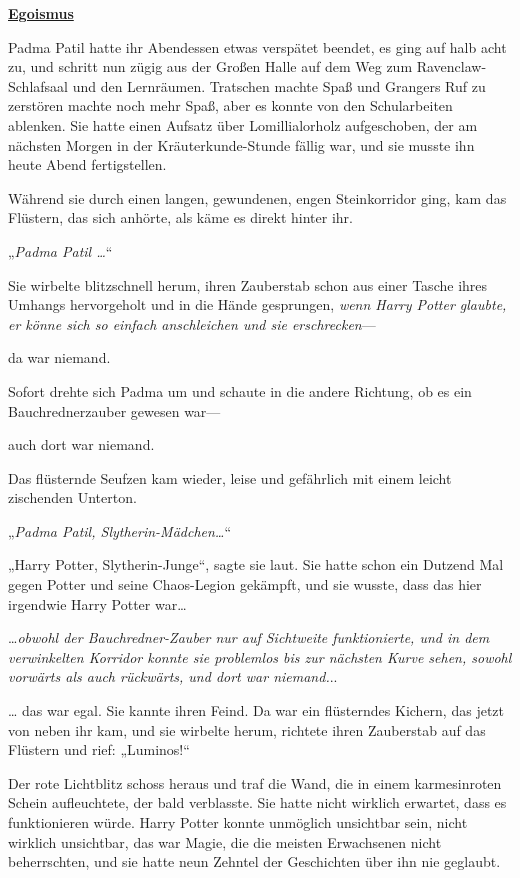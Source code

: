 

\hypertarget{egoismus}{%

\textbf{\uline{Egoismus}}

Padma Patil hatte ihr Abendessen etwas verspätet beendet, es ging auf halb acht zu, und schritt nun zügig aus der Großen Halle auf dem Weg zum Ravenclaw-Schlafsaal und den Lernräumen. Tratschen machte Spaß und Grangers Ruf zu zerstören machte noch mehr Spaß, aber es konnte von den Schularbeiten ablenken. Sie hatte einen Aufsatz über Lomillialorholz aufgeschoben, der am nächsten Morgen in der Kräuterkunde-Stunde fällig war, und sie musste ihn heute Abend fertigstellen.

Während sie durch einen langen, gewundenen, engen Steinkorridor ging, kam das Flüstern, das sich anhörte, als käme es direkt hinter ihr.

„\emph{Padma Patil …}“

Sie wirbelte blitzschnell herum, ihren Zauberstab schon aus einer Tasche ihres Umhangs hervorgeholt und in die Hände gesprungen, \emph{wenn Harry Potter glaubte, er könne sich so einfach anschleichen und sie erschrecken}—

da war niemand.

Sofort drehte sich Padma um und schaute in die andere Richtung, ob es ein Bauchrednerzauber gewesen war—

auch dort war niemand.

Das flüsternde Seufzen kam wieder, leise und gefährlich mit einem leicht zischenden Unterton.

„\emph{Padma Patil, Slytherin-Mädchen…}“

„Harry Potter, Slytherin-Junge“, sagte sie laut. Sie hatte schon ein Dutzend Mal gegen Potter und seine Chaos-Legion gekämpft, und sie wusste, dass das hier irgendwie Harry Potter war…

…\emph{obwohl der Bauchredner-Zauber nur auf Sichtweite funktionierte, und in dem verwinkelten Korridor konnte sie problemlos bis zur nächsten Kurve sehen, sowohl vorwärts als auch rückwärts, und dort war niemand.}..

… das war egal. Sie kannte ihren Feind. Da war ein flüsterndes Kichern, das jetzt von neben ihr kam, und sie wirbelte herum, richtete ihren Zauberstab auf das Flüstern und rief: „Luminos!“

Der rote Lichtblitz schoss heraus und traf die Wand, die in einem karmesinroten Schein aufleuchtete, der bald verblasste. Sie hatte nicht wirklich erwartet, dass es funktionieren würde. Harry Potter konnte unmöglich unsichtbar sein, nicht wirklich unsichtbar, das war Magie, die die meisten Erwachsenen nicht beherrschten, und sie hatte neun Zehntel der Geschichten über ihn nie geglaubt.

}
